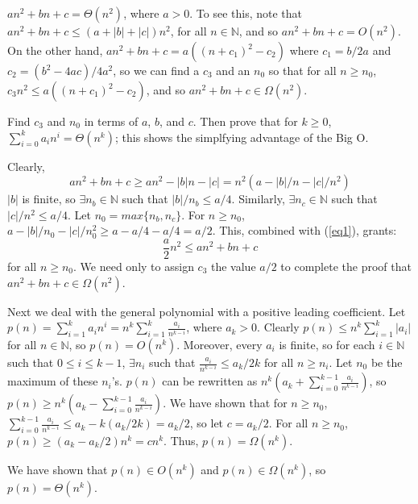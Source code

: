 \documentclass{article}
\newenvironment{prb}[1]
	{\renewcommand\theinner{#1}\inner}
	{\endinner}
\newcommand{\N}{\mathbb{N}}
\begin{document}
$an^2+bn+c=\Theta(n^2)$, where $a>0$. To see this, note that 
$an^2+bn+c\leq(a+|b|+|c|)n^2$, for all $n\in\N$, and so 
$an^2+bn+c=O(n^2)$. On the other hand, 
$an^2+bn+c=a((n+c_1)^2-c_2)$ where $c_1=b/2a$ and 
$c_2=(b^2-4ac)/4a^2$, so we can find a $c_3$ and an $n_0$ so that
for all $n\geq n_0$, $c_3n^2\leq a((n+c_1)^2-c_2)$, and so
$an^2+bn+c\in\Omega(n^2)$.

\begin{prb}{1.2}
Find $c_3$ and $n_0$ in terms of $a$, $b$, and $c$. Then prove that
for $k\geq0$, $\sum_{i=0}^ka_in^i=\Theta(n^k)$; this shows the 
simplfying advantage of the Big O.
\end{prb}

\break
Clearly, 
\begin{equation}\label{eq1}
an^2+bn+c\ge an^2-|b|n-|c|=n^2(a-|b|/n-|c|/n^2)
\end{equation} 
$|b|$ is finite, so $\exists n_b\in\N$ such that $|b|/n_b\le a/4$.
Similarly, $\exists n_c\in\N$ such that $|c|/n^2\le a/4$.
Let $n_0=max\{n_b,n_c\}$. For $n\ge n_0$, 
$a-|b|/n_0-|c|/n_0^2\ge a-a/4-a/4=a/2$. This, combined with (\ref{eq1}),
grants:
\begin{equation}\label{eq2}
\frac{a}{2}n^2\leq an^2+bn+c
\end{equation}
for all $n\ge n_0$. We need only to assign $c_3$ the value $a/2$ to complete
the proof that $an^2+bn+c\in\Omega(n^2)$.

Next we deal with the general polynomial with a positive leading coefficient.
Let $p(n)=\sum_{i=1}^ka_in^i=n^k\sum_{i=1}^k\frac{a_i}{n^{k-i}}$, 
where $a_k>0$. Clearly $p(n)\leq n^k\sum_{i=1}^k|a_i|$ for all $n\in\N$,
so $p(n)=O(n^k)$. Moreover, every $a_i$ is finite, so for each $i\in\N$
such that $0\le i\le k-1$, $\exists n_i$ such that 
$\frac{a_i}{n^{k-i}}\le a_k/2k$ for all $n\ge n_i$. Let $n_0$ be the maximum of
these $n_i$'s. $p(n)$ can be rewritten as 
$n^k(a_k+\sum_{i=0}^{k-1}\frac{a_i}{n^{k-i}})$, so 
$p(n)\ge n^k(a_k-\sum_{i=0}^{k-1}\frac{a_i}{n^{k-i}})$.
We have shown that for $n\ge n_0$, 
$\sum_{i=0}^{k-1}\frac{a_i}{n^{k-i}}\le a_k-k(a_k/2k)=a_k/2$, so let $c=a_k/2$.
For all $n\ge n_0$, $p(n)\ge(a_k-a_k/2)n^k=cn^k$. Thus, $p(n)=\Omega(n^k)$.

We have shown that $p(n)\in O(n^k)$ and $p(n)\in\Omega(n^k)$, so 
$p(n)=\Theta(n^k)$. 
\end{document}
